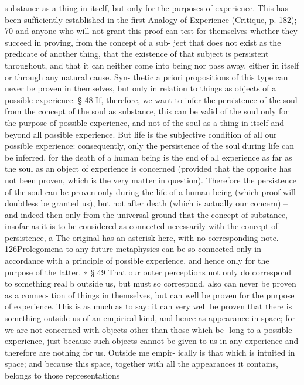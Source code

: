 substance as a thing in itself, but only for the purposes of experience.
This has been sufﬁciently established in the ﬁrst Analogy of Experience
(Critique, p. 182); 70 and anyone who will not grant this proof can test for
themselves whether they succeed in proving, from the concept of a sub-
ject that does not exist as the predicate of another thing, that the existence
of that subject is persistent throughout, and that it can neither come into
being nor pass away, either in itself or through any natural cause. Syn-
thetic a priori propositions of this type can never be proven in themselves,
but only in relation to things as objects of a possible experience.
§ 48
If, therefore, we want to infer the persistence of the soul from the concept
of the soul as substance, this can be valid of the soul only for the purpose of
possible experience, and not of the soul as a thing in itself and beyond all
possible experience. But life is the subjective condition of all our possible
experience: consequently, only the persistence of the soul during life can
be inferred, for the death of a human being is the end of all experience
as far as the soul as an object of experience is concerned (provided that
the opposite has not been proven, which is the very matter in question).
Therefore the persistence of the soul can be proven only during the life
of a human being (which proof will doubtless be granted us), but not
after death (which is actually our concern) – and indeed then only from
the universal ground that the concept of substance, insofar as it is to
be considered as connected necessarily with the concept of persistence,
a
The original has an asterisk here, with no corresponding note.
126Prolegomena to any future metaphysics
can be so connected only in accordance with a principle of possible
experience, and hence only for the purpose of the latter. ∗
§ 49
That our outer perceptions not only do correspond to something real b
outside us, but must so correspond, also can never be proven as a connec-
tion of things in themselves, but can well be proven for the purpose of
experience. This is as much as to say: it can very well be proven that there
is something outside us of an empirical kind, and hence as appearance in
space; for we are not concerned with objects other than those which be-
long to a possible experience, just because such objects cannot be given to
us in any experience and therefore are nothing for us. Outside me empir-
ically is that which is intuited in space; and because this space, together
with all the appearances it contains, belongs to those representations
